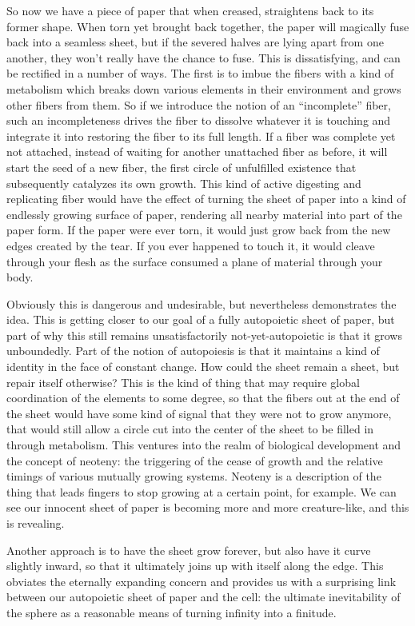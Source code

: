 \documentclass[12pt]{scrartcl}
\begin{document}
So now we have a piece of paper that when creased, straightens back to its former shape.  When torn yet brought back together, the paper will magically fuse back into a seamless sheet, but if the severed halves are lying apart from one another, they won't really have the chance to fuse.  This is dissatisfying, and can be rectified in a number of ways.  The first is to imbue the fibers with a kind of metabolism which breaks down various elements in their environment and grows other fibers from them.  So if we introduce the notion of an ``incomplete'' fiber, such an incompleteness drives the fiber to dissolve whatever it is touching and integrate it into restoring the fiber to its full length.  If a fiber was complete yet not attached, instead of waiting for another unattached fiber as before, it will start the seed of a new fiber, the first circle of unfulfilled existence that subsequently catalyzes its own growth.  This kind of active digesting and replicating fiber would have the effect of turning the sheet of paper into a kind of endlessly growing surface of paper, rendering all nearby material into part of the paper form.  If the paper were ever torn, it would just grow back from the new edges created by the tear.  If you ever happened to touch it, it would cleave through your flesh as the surface consumed a plane of material through your body.  

Obviously this is dangerous and undesirable, but nevertheless demonstrates the idea.  This is getting closer to our goal of a fully autopoietic sheet of paper, but part of why this still remains unsatisfactorily not-yet-autopoietic is that it grows unboundedly.  Part of the notion of autopoiesis is that it maintains a kind of identity in the face of constant change.  How could the sheet remain a sheet, but repair itself otherwise?  This is the kind of thing that may require global coordination of the elements to some degree, so that the fibers out at the end of the sheet would have some kind of signal that they were not to grow anymore, that would still allow a circle cut into the center of the sheet to be filled in through metabolism.  This ventures into the realm of biological development and the concept of neoteny: the triggering of the cease of growth and the relative timings of various mutually growing systems.  Neoteny is a description of the thing that leads fingers to stop growing at a certain point, for example.  We can see our innocent sheet of paper is becoming more and more creature-like, and this is revealing.  

Another approach is to have the sheet grow forever, but also have it curve slightly inward, so that it ultimately joins up with itself along the edge.  This obviates the eternally expanding concern and provides us with a surprising link between our autopoietic sheet of paper and the cell: the ultimate inevitability of the sphere as a reasonable means of turning infinity into a finitude.
\end{document}
